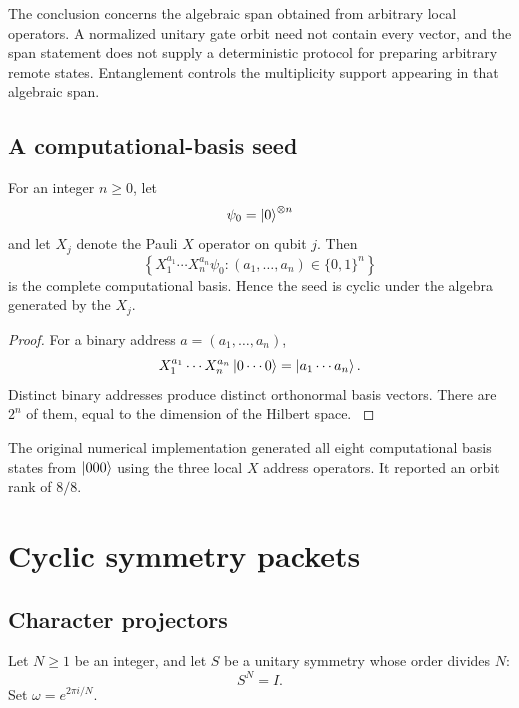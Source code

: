The conclusion concerns the algebraic span obtained from arbitrary local operators. A normalized unitary gate orbit need not contain every vector, and the span statement does not supply a deterministic protocol for preparing arbitrary remote states. Entanglement controls the multiplicity support appearing in that algebraic span.

\subsection{A computational-basis seed}

\begin{theorem}\label{core:theorem:003}\label{core:thm:computational}
For an integer $n\ge0$, let
\[
\psi_0=\left|0\right\rangle^{\otimes n}
\]
and let $X_j$ denote the Pauli $X$ operator on qubit $j$. Then
\[
\left\{
X_1^{a_1}\cdots X_n^{a_n}\psi_0:
(a_1,\ldots,a_n)\in\{0,1\}^n
\right\}
\]
is the complete computational basis. Hence the seed is cyclic under the algebra generated by the $X_j$.
\end{theorem}

\begin{proof}\label{core:proof:004}
For a binary address $a=(a_1,\ldots,a_n)$,
\[
X_1^{a_1}\cdots X_n^{a_n}\left|0\cdots0\right\rangle
=
\left|a_1\cdots a_n\right\rangle.
\]
Distinct binary addresses produce distinct orthonormal basis vectors. There are $2^n$ of them, equal to the dimension of the Hilbert space.
\label{core:proof:004:end}\end{proof}

\begin{certificate}\label{core:certificate:001}
The original numerical implementation generated all eight computational basis states from $\left|000\right\rangle$ using the three local $X$ address operators. It reported an orbit rank of $8/8$.
\end{certificate}

\section{Cyclic symmetry packets}\label{core:section:003}

\subsection{Character projectors}

Let $N\ge1$ be an integer, and let $S$ be a unitary symmetry whose order divides $N$:
\[
S^N=I.
\]
Set $\omega=e^{2\pi i/N}$.


